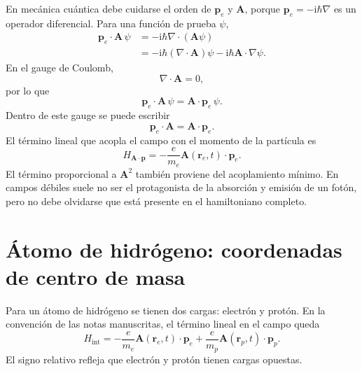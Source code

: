 \documentclass[11pt]{article}
\newcommand{\ii}{\mathrm{i}}
\newcommand{\vb}[1]{\mathbf{#1}}
\begin{document}
En mec\'anica cu\'antica debe cuidarse el orden de \(\vb p_e\) y
\(\vb A\), porque \(\vb p_e=-\ii\hbar\nabla\) es un operador diferencial. Para
una funci\'on de prueba \(\psi\),
\begin{align}
  \vb p_e\cdot\vb A\,\psi
  &=
  -\ii\hbar\nabla\cdot(\vb A\psi)                                             \\
  &=
  -\ii\hbar(\nabla\cdot\vb A)\psi
  -\ii\hbar\vb A\cdot\nabla\psi .
\end{align}
En el gauge de Coulomb,
\begin{equation}
  \nabla\cdot\vb A=0,
\end{equation}
por lo que
\begin{equation}
  \vb p_e\cdot\vb A\,\psi
  =
  \vb A\cdot\vb p_e\,\psi.
\end{equation}
Dentro de este gauge se puede escribir
\begin{equation}
  \vb p_e\cdot\vb A
  =
  \vb A\cdot\vb p_e.
\end{equation}
El t\'ermino lineal que acopla el campo con el momento de la part\'icula es
\begin{equation}
  \boxed{
  H_{\vb A\cdot\vb p}
  =
  -\frac{e}{m_e}\vb A(\vb r_e,t)\cdot\vb p_e .
  }
\end{equation}
El t\'ermino proporcional a \(\vb A^2\) tambi\'en proviene del acoplamiento
m\'inimo. En campos d\'ebiles suele no ser el protagonista de la absorci\'on y
emisi\'on de un fot\'on, pero no debe olvidarse que est\'a presente en el
hamiltoniano completo.

\section{\'Atomo de hidr\'ogeno: coordenadas de centro de masa}

Para un \'atomo de hidr\'ogeno se tienen dos cargas: electr\'on y prot\'on. En
la convenci\'on de las notas manuscritas, el t\'ermino lineal en el campo queda
\begin{equation}
  H_{\mathrm{int}}
  =
  -\frac{e}{m_e}
  \vb A(\vb r_e,t)\cdot\vb p_e
  +
  \frac{e}{m_p}
  \vb A(\vb r_p,t)\cdot\vb p_p .
\end{equation}
El signo relativo refleja que electr\'on y prot\'on tienen cargas opuestas.
\end{document}
